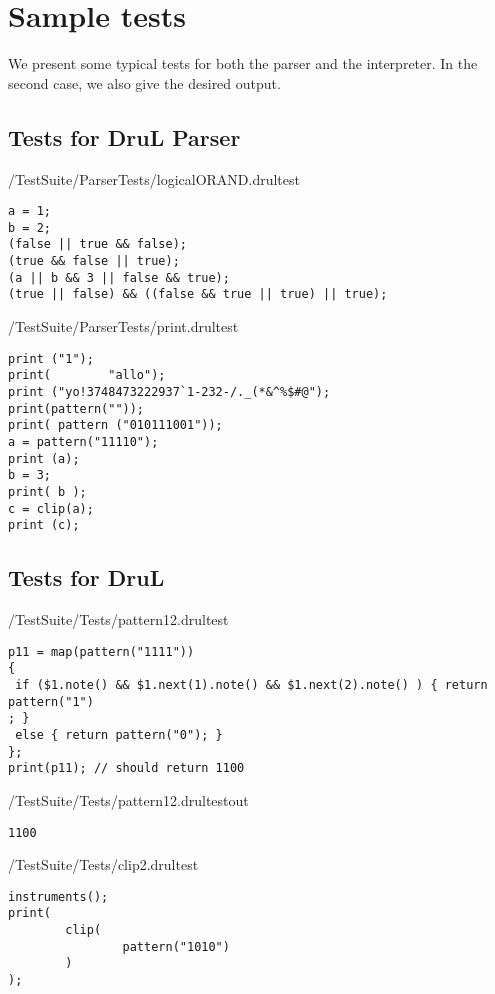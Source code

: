 \section{Sample tests} \label{ts:samples}
We present some typical tests for both the parser and the interpreter. In the
second case, we also give the desired output.

\subsection{Tests for DruL Parser}

/TestSuite/ParserTests/logicalORAND.drultest

\begin{lstlisting}[basicstyle=\color{red}\small]
a = 1;
b = 2;
(false || true && false);
(true && false || true);
(a || b && 3 || false && true);
(true || false) && ((false && true || true) || true);
\end{lstlisting}


/TestSuite/ParserTests/print.drultest
\begin{lstlisting}[basicstyle=\color{red}\small]
print ("1");
print(        "allo");
print ("yo!3748473222937`1-232-/._(*&^%$#@");
print(pattern(""));
print( pattern ("010111001"));
a = pattern("11110");
print (a);
b = 3;
print( b );
c = clip(a);
print (c);
\end{lstlisting}


\subsection{Tests for DruL}

/TestSuite/Tests/pattern12.drultest
\begin{lstlisting}[basicstyle=\color{red}\small]
p11 = map(pattern("1111"))
{
 if ($1.note() && $1.next(1).note() && $1.next(2).note() ) { return pattern("1")
; }
 else { return pattern("0"); }
};
print(p11); // should return 1100
\end{lstlisting}

/TestSuite/Tests/pattern12.drultestout

\begin{lstlisting}[basicstyle=\color{blue}\small]
1100
\end{lstlisting}


/TestSuite/Tests/clip2.drultest

\begin{lstlisting}[basicstyle=\color{red}\small]
instruments();
print(
        clip(
                pattern("1010")
        )
);
\end{lstlisting}

